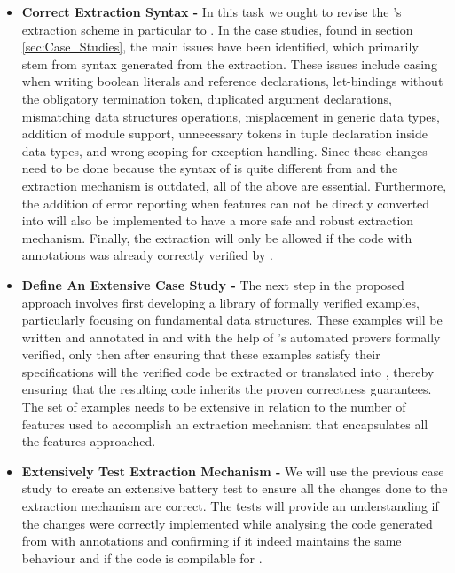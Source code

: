 \begin{itemize}

\item \textbf{Correct Extraction Syntax -} In this task we ought to revise the \whythree's extraction scheme in particular to \cml. In the 
case studies, found in section \ref{sec:Case_Studies}, the main issues have been identified, which primarily stem from
syntax generated from the extraction. These issues include casing when writing boolean literals and reference
declarations, let-bindings without the obligatory termination token, duplicated argument declarations, mismatching data structures operations, 
misplacement in generic data types, addition of module support, unnecessary tokens in tuple declaration inside data types, and 
wrong scoping for exception handling. 
Since these changes need to be done because the syntax of \ocaml is quite different from \cml and the extraction mechanism is outdated,
all of the above are essential. Furthermore, the addition of error reporting when features can not be directly converted into \cml will also
be implemented to have a more safe and robust extraction mechanism. Finally, the extraction will only be allowed if the \ocaml code with
\gospel annotations was already correctly verified by \cameleer.


\item \textbf{Define An Extensive Case Study -} The next step in the proposed approach involves first developing a library of formally 
verified examples, particularly focusing on fundamental data structures. These examples will be written and annotated in \whyml 
and with the help of \whythree's automated provers formally verified, only then after ensuring that these examples satisfy their 
specifications will the verified code be extracted or translated into \cml, thereby ensuring that the resulting \cml code inherits 
the proven correctness guarantees. The set of examples needs to be extensive in relation to the number of features used to accomplish
an extraction mechanism that encapsulates all the features approached.

\item \textbf{Extensively Test Extraction Mechanism -} We will use the previous case study to create an extensive battery test to ensure 
all the changes done to the extraction mechanism are correct. The tests will provide an understanding if the changes were correctly
implemented while analysing the code generated from \ocaml with \gospel annotations and confirming if it indeed maintains the same 
behaviour and if the code is compilable for \cml.

\end{itemize}

